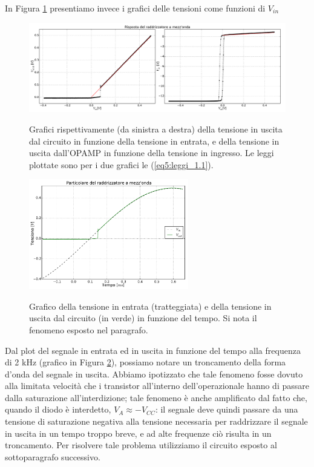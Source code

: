 In Figura \ref{gr5:primo_raddrizzatore_vin} presentiamo invece i grafici delle tensioni come funzioni di $V_{in}$

\begin{figure}[H]
 \centering
   {\includegraphics[width=\textwidth]{../E05/latex/u_risposta.pdf}}
 \caption{Grafici rispettivamente (da sinistra a destra) della tensione in uscita dal circuito in funzione della tensione in entrata, e della tensione in uscita dall'OPAMP in funzione della tensione in ingresso. Le leggi plottate sono per i due grafici le (\ref{eq5:leggi_1.1}).}
 \label{gr5:primo_raddrizzatore_vin}
\end{figure}

\begin{figure}
 \centering
   {\includegraphics[width=0.62\textwidth]{../E05/latex/zoom.pdf}}
 \caption{Grafico della tensione in entrata (tratteggiata) e della tensione in uscita dal circuito (in verde) in funzione del tempo. Si nota il fenomeno esposto nel paragrafo.}
 \label{gr5:problema}
\end{figure}

Dal plot del segnale in entrata ed in uscita in funzione del tempo alla frequenza di 2 \si{\kilo\hertz} (grafico in Figura \ref{gr5:problema}), possiamo notare un troncamento della forma d'onda del segnale in uscita. Abbiamo ipotizzato che tale fenomeno fosse dovuto alla limitata velocità che i transistor all'interno dell'operazionale hanno di passare dalla saturazione all'interdizione; tale fenomeno è anche amplificato dal fatto che, quando il diodo è interdetto, $V_{A} \approx -V_{CC}$: il segnale deve quindi passare da una tensione di saturazione negativa alla tensione necessaria per raddrizzare il segnale in uscita in un tempo troppo breve, e ad alte frequenze ciò risulta in un troncamento. Per risolvere tale problema utilizziamo il circuito esposto al sottoparagrafo successivo.

